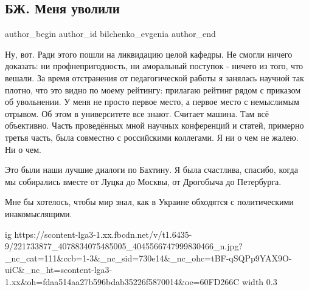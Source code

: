  
 
 
 
 
 
\subsection{БЖ. Меня уволили}
\label{sec:22_07_2021.fb.bilchenko_evgenia.1.uvolnenie}
 
\ifcmt
 author_begin
   author_id bilchenko_evgenia
 author_end
\fi

Ну, вот. Ради этого пошли на ликвидацию целой кафедры. Не смогли ничего
доказать: ни профнепригодность, ни аморальный поступок - ничего из того, что
вешали. За время отстранения от педагогической работы я занялась научной так
плотно, что это видно по моему рейтингу: прилагаю рейтинг рядом с приказом об
увольнении. У меня не просто первое место, а первое место с немыслимым отрывом.
Об этом в университете все знают. Считает машина. Там всё объективно. Часть
проведённых мной научных конференций и статей, примерно третья часть, была
совместно с российскими коллегами. Я ни о чем не жалею.  Ни о чем. 

Это были наши лучшие диалоги по Бахтину. Я была счастлива, спасибо, когда мы
собирались вместе от Луцка до Москвы, от Дрогобыча до Петербурга.

Мне бы хотелось, чтобы мир знал, как в Украине обходятся с политическими
инакомыслящими.

\ifcmt
  ig https://scontent-lga3-1.xx.fbcdn.net/v/t1.6435-9/221733877_4078834075485005_4045566747999830466_n.jpg?_nc_cat=111&ccb=1-3&_nc_sid=730e14&_nc_ohc=tBF-qSQPp9YAX9O-uiC&_nc_ht=scontent-lga3-1.xx&oh=fdaa514aa27b596bdab35226f5870014&oe=60FD266C
  width 0.3
\fi

